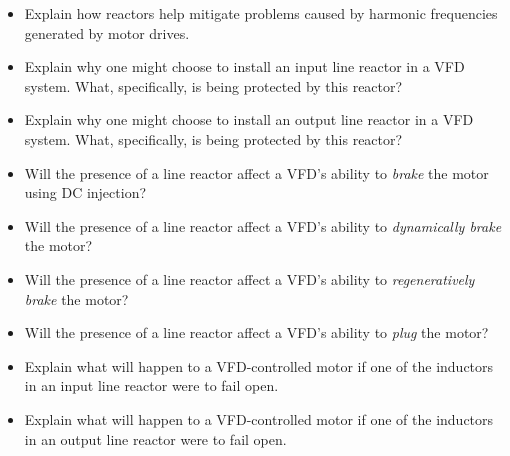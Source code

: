 \begin{itemize}
\item{} Explain how reactors help mitigate problems caused by harmonic frequencies generated by motor drives.
\item{} Explain why one might choose to install an input line reactor in a VFD system.  What, specifically, is being protected by this reactor?
\item{} Explain why one might choose to install an output line reactor in a VFD system.  What, specifically, is being protected by this reactor?
\item{} Will the presence of a line reactor affect a VFD's ability to {\it brake} the motor using DC injection? 
\item{} Will the presence of a line reactor affect a VFD's ability to {\it dynamically brake} the motor? 
\item{} Will the presence of a line reactor affect a VFD's ability to {\it regeneratively brake} the motor? 
\item{} Will the presence of a line reactor affect a VFD's ability to {\it plug} the motor? 
\item{} Explain what will happen to a VFD-controlled motor if one of the inductors in an input line reactor were to fail open.
\item{} Explain what will happen to a VFD-controlled motor if one of the inductors in an output line reactor were to fail open.
\end{itemize}




